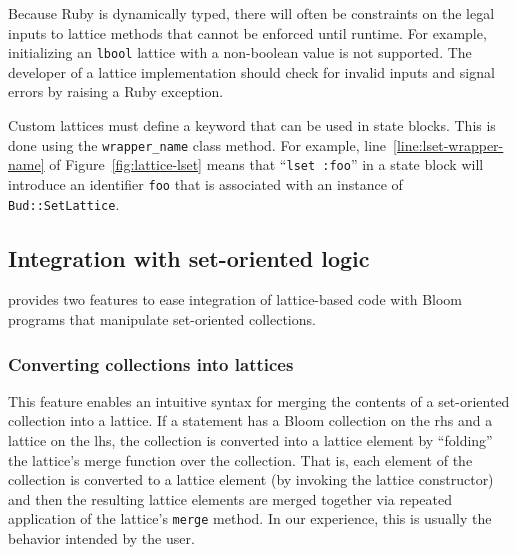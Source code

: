 Because Ruby is dynamically typed, there will often be constraints on the legal
inputs to lattice methods that cannot be enforced until runtime. For example,
initializing an \texttt{lbool} lattice with a non-boolean value is not
supported. The developer of a lattice implementation should check for invalid
inputs and signal errors by raising a Ruby exception.


Custom lattices must define a keyword that can be used in \lang state
blocks. This is done using the \texttt{wrapper\_name} class method. For example,
line~\ref{line:lset-wrapper-name} of Figure~\ref{fig:lattice-lset} means that
``\texttt{lset :foo}'' in a state block will introduce an identifier
\texttt{foo} that is associated with an instance of \texttt{Bud::SetLattice}.

\subsection{Integration with set-oriented logic}
\label{sec:bloom-interop}
\lang provides two features to ease integration of lattice-based code with Bloom
programs that manipulate set-oriented collections.

\subsubsection{Converting collections into lattices}
This feature enables an intuitive syntax for merging the contents of a
set-oriented collection into a lattice. If a statement has a Bloom collection on
the rhs and a lattice on the lhs, the collection is converted into a lattice
element by ``folding'' the lattice's merge function over the collection. That
is, each element of the collection is converted to a lattice element (by
invoking the lattice constructor) and then the resulting lattice elements are
merged together via repeated application of the lattice's \texttt{merge}
method. In our experience, this is usually the behavior intended by the user.

